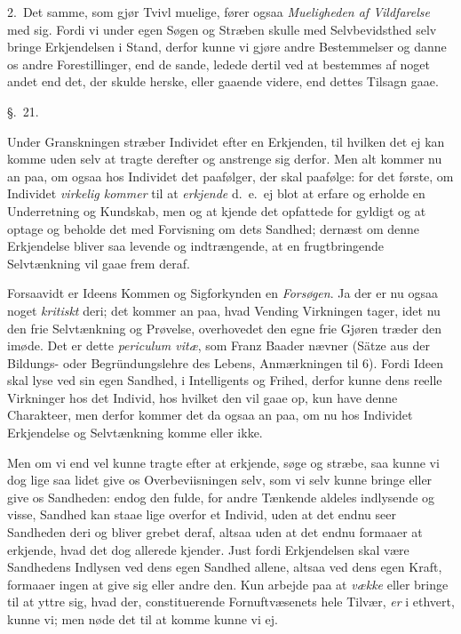 \documentclass[12pt,a4paper]{book}
\newcommand{\apage}[1]{\marginnote{\footnotesize\textit{[#1]}}}
\begin{document}
2.~Det samme, som gjør Tvivl muelige, fører ogsaa \emph{Mueligheden af Vildfarelse}
med sig. Fordi vi under egen Søgen og Stræben skulle med Selvbevidsthed selv
bringe Erkjendelsen  \apage{165} i Stand, derfor kunne vi gjøre andre Bestemmelser og danne os
andre Forestillinger, end de sande, ledede dertil ved at bestemmes af noget andet
end det, der skulde herske, eller gaaende videre, end dettes Tilsagn gaae.

\begin{center}\large\S.~21.\end{center}

Under Granskningen stræber Individet efter en Erkjenden, til hvilken det ej kan
komme uden selv at tragte derefter og anstrenge sig derfor. Men alt kommer nu an
paa, om ogsaa hos Individet det paafølger, der skal paafølge: for det første, om
Individet \emph{virkelig kommer} til at \emph{erkjende} d.\ e.\ ej blot at erfare og
erholde en Underretning og Kundskab, men og at kjende det opfattede for gyldigt
og at optage og beholde det med Forvisning om dets Sandhed; dernæst om denne
Erkjendelse bliver saa levende og indtrængende, at en frugtbringende Selvtænkning
vil gaae frem deraf.

Forsaavidt er Ideens Kommen og Sigforkynden en \emph{Forsøgen}. Ja der er nu ogsaa
noget \emph{kritiskt} deri; det kommer an paa, hvad Vending Virkningen tager, idet
nu den frie Selvtænkning og Prøvelse, overhovedet den egne frie Gjøren træder den
imøde. Det er dette \emph{periculum vitæ}, som Franz Baader nævner (Sätze aus der
Bildungs- oder Begründungslehre des Lebens, \apage{166} Anmærkningen til 6). Fordi Ideen skal
lyse ved sin egen Sandhed, i Intelligents og Frihed, derfor kunne dens reelle
Virkninger hos det Individ, hos hvilket den vil gaae op, kun have denne Charakteer,
men derfor kommer det da ogsaa an paa, om nu hos Individet Erkjendelse og
Selvtænkning komme eller ikke.

Men om vi end vel kunne tragte efter at erkjende, søge og stræbe, saa kunne vi dog
lige saa lidet give os Overbeviisningen selv, som vi selv kunne bringe eller give
os Sandheden: endog den fulde, for andre Tænkende aldeles indlysende og visse,
Sandhed kan staae lige overfor et Individ, uden at det endnu seer Sandheden deri
og bliver grebet deraf, altsaa uden at det endnu formaaer at erkjende, hvad det
dog allerede kjender. Just fordi Erkjendelsen skal være Sandhedens Indlysen ved
dens egen Sandhed allene, altsaa ved dens egen Kraft, formaaer ingen at give sig
eller andre den. Kun arbejde paa at \emph{vække} eller bringe til at yttre sig,
hvad der, constituerende Fornuftvæsenets hele Tilvær, \emph{er} i ethvert, kunne vi; men
nøde det til at komme kunne vi ej.
\end{document}
